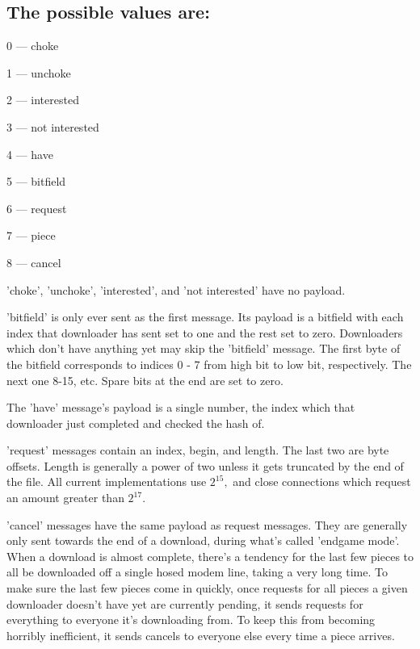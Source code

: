 \documentclass{article}
\begin{document}
{\subsection{The possible values are:}}
{\begin{itemize}
  {\item 0 --- choke}
  {\item 1 --- unchoke}
  {\item 2 --- interested}
  {\item 3 --- not interested}
  {\item 4 --- have}
  {\item 5 --- bitfield}
  {\item 6 --- request}
  {\item 7 --- piece}
  {\item 8 --- cancel}
\end{itemize}}

'choke', 'unchoke', 'interested', and 'not interested' have no payload.

'bitfield' is only ever sent as the first message. Its payload is a bitfield with each index that downloader has sent set to one and the rest set to zero. Downloaders which don't have anything yet may skip the 'bitfield' message. The first byte of the bitfield corresponds to indices 0 - 7 from high bit to low bit, respectively. The next one 8-15, etc. Spare bits at the end are set to zero.

The 'have' message's payload is a single number, the index which that downloader just completed and checked the hash of.

'request' messages contain an index, begin, and length. The last two are byte offsets. Length is generally a power of two unless it gets truncated by the end of the file. All current implementations use $2^{15},$ and close connections which request an amount greater than $2^{17}.$

'cancel' messages have the same payload as request messages. They are generally only sent towards the end of a download, during what's called 'endgame mode'. When a download is almost complete, there's a tendency for the last few pieces to all be downloaded off a single hosed modem line, taking a very long time. To make sure the last few pieces come in quickly, once requests for all pieces a given downloader doesn't have yet are currently pending, it sends requests for everything to everyone it's downloading from. To keep this from becoming horribly inefficient, it sends cancels to everyone else every time a piece arrives.
\end{document}
